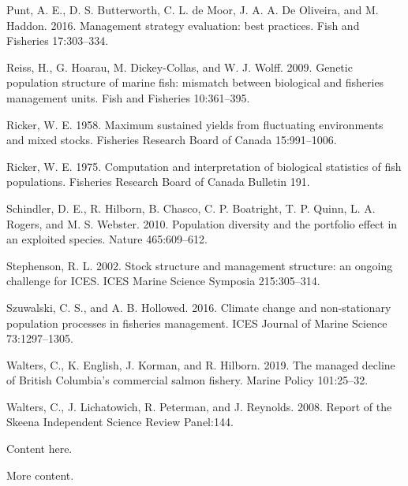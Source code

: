 \documentclass[11pt]{book}
\begin{document}
\hypertarget{ref-Punt2016}{}
Punt, A. E., D. S. Butterworth, C. L. de Moor, J. A. A. De Oliveira, and M. Haddon. 2016. Management strategy evaluation: best practices. Fish and Fisheries 17:303--334.

\hypertarget{ref-Reiss2009}{}
Reiss, H., G. Hoarau, M. Dickey-Collas, and W. J. Wolff. 2009. Genetic population structure of marine fish: mismatch between biological and fisheries management units. Fish and Fisheries 10:361--395.

\hypertarget{ref-Ricker1958}{}
Ricker, W. E. 1958. Maximum sustained yields from fluctuating environments and mixed stocks. Fisheries Research Board of Canada 15:991--1006.

\hypertarget{ref-Ricker1975}{}
Ricker, W. E. 1975. Computation and interpretation of biological statistics of fish populations. Fisheries Research Board of Canada Bulletin 191.

\hypertarget{ref-Schindler2010}{}
Schindler, D. E., R. Hilborn, B. Chasco, C. P. Boatright, T. P. Quinn, L. A. Rogers, and M. S. Webster. 2010. Population diversity and the portfolio effect in an exploited species. Nature 465:609--612.

\hypertarget{ref-Stephenson2002a}{}
Stephenson, R. L. 2002. Stock structure and management structure: an ongoing challenge for ICES. ICES Marine Science Symposia 215:305--314.

\hypertarget{ref-Szuwalski2016}{}
Szuwalski, C. S., and A. B. Hollowed. 2016. Climate change and non-stationary population processes in fisheries management. ICES Journal of Marine Science 73:1297--1305.

\hypertarget{ref-Walters2019}{}
Walters, C., K. English, J. Korman, and R. Hilborn. 2019. The managed decline of British Columbia's commercial salmon fishery. Marine Policy 101:25--32.

\hypertarget{ref-Walters2008}{}
Walters, C., J. Lichatowich, R. Peterman, and J. Reynolds. 2008. Report of the Skeena Independent Science Review Panel:144.

\setlength{\parindent}{0in} \setlength{\leftskip}{0in} \setlength{\parskip}{4pt}

\Appendices

\clearpage


\label{app:first-appendix}

Content here.

\clearpage


\label{app:second-appendix}

More content.
\end{document}

